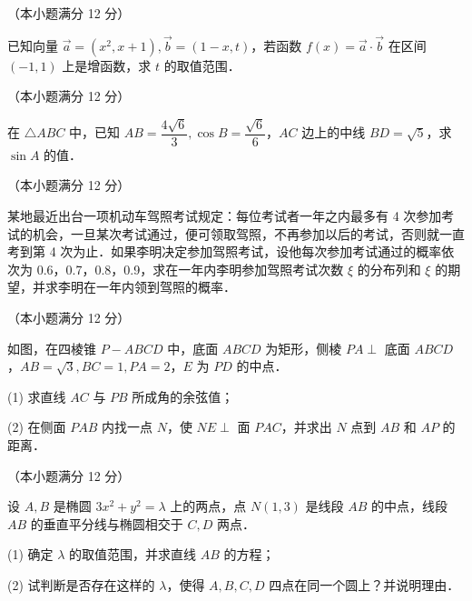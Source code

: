 \begin{question}
（本小题满分 12 分）

已知向量 $\vec{a} = (x^2, x + 1), \vec{b} = (1 - x, t)$，若函数 $f(x) = \vec{a} \cdot \vec{b}$ 在区间 $(-1, 1)$ 上是增函数，求 $t$ 的取值范围．

\end{question}
\begin{question}
（本小题满分 12 分）

在 $\triangle ABC$ 中，已知 $AB = \dfrac{4\sqrt{6}}{3}, \cos B = \dfrac{\sqrt{6}}{6}$，$AC$ 边上的中线 $BD = \sqrt{5}$，求 $\sin A$ 的值．

\end{question}
\begin{question}
（本小题满分 12 分）

某地最近出台一项机动车驾照考试规定：每位考试者一年之内最多有 4 次参加考试的机会，一旦某次考试通过，便可领取驾照，不再参加以后的考试，否则就一直考到第 4 次为止．如果李明决定参加驾照考试，设他每次参加考试通过的概率依次为 0.6，0.7，0.8，0.9，求在一年内李明参加驾照考试次数 $\xi$ 的分布列和 $\xi$ 的期望，并求李明在一年内领到驾照的概率．

\Needspace{0.4\textheight}
\end{question}
\begin{question}
（本小题满分 12 分）

如图，在四棱锥 $P - ABCD$ 中，底面 $ABCD$ 为矩形，侧棱 $PA \perp$ 底面 $ABCD$，$AB = \sqrt{3}, BC = 1, PA = 2$，$E$ 为 $PD$ 的中点．
\nopagebreak[4]
\begin{center}\end{center}
\nopagebreak[4]
(1) 求直线 $AC$ 与 $PB$ 所成角的余弦值；

(2) 在侧面 $PAB$ 内找一点 $N$，使 $NE \perp$ 面 $PAC$，并求出 $N$ 点到 $AB$ 和 $AP$ 的距离．

\end{question}
\begin{question}
（本小题满分 12 分）

设 $A, B$ 是椭圆 $3x^2 + y^2 = \lambda$ 上的两点，点 $N(1, 3)$ 是线段 $AB$ 的中点，线段 $AB$ 的垂直平分线与椭圆相交于 $C, D$ 两点．

(1) 确定 $\lambda$ 的取值范围，并求直线 $AB$ 的方程；

(2) 试判断是否存在这样的 $\lambda$，使得 $A, B, C, D$ 四点在同一个圆上？并说明理由．

\end{question}
